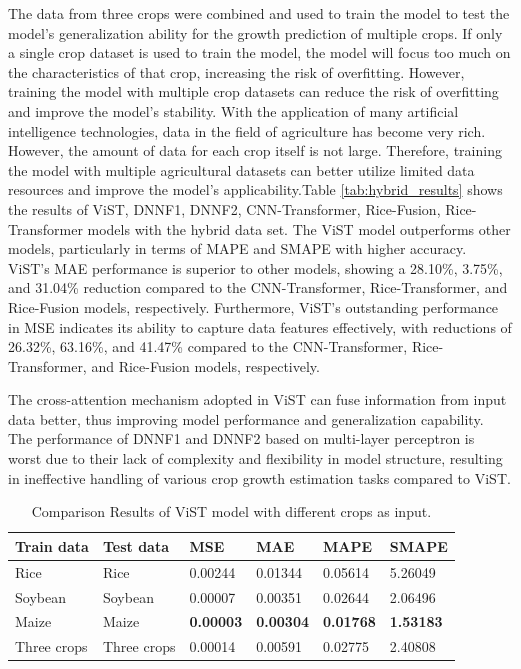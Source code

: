 \documentclass[acmsmall,manuscript, screen, review]{acmart}
\begin{document}
The data from three crops were combined and used to train the model to test the model's generalization ability for the growth prediction of multiple crops. If only a single crop dataset is used to train the model, the model will focus too much on the characteristics of that crop, increasing the risk of overfitting. However, training the model with multiple crop datasets can reduce the risk of overfitting and improve the model's stability. With the application of many artificial intelligence technologies, data in the field of agriculture has become very rich. However, the amount of data for each crop itself is not large. Therefore, training the model with multiple agricultural datasets can better utilize limited data resources and improve the model's applicability.Table \ref{tab:hybrid_results} shows the results of ViST, DNNF1, DNNF2, CNN-Transformer, Rice-Fusion, Rice-Transformer models with the hybrid data set. The ViST model outperforms other models, particularly in terms of MAPE and SMAPE with higher accuracy. ViST's MAE performance is superior to other models, showing a 28.10\%, 3.75\%, and 31.04\% reduction compared to the CNN-Transformer, Rice-Transformer, and Rice-Fusion models, respectively. Furthermore, ViST's outstanding performance in MSE indicates its ability to capture data features effectively, with reductions of 26.32\%, 63.16\%, and 41.47\% compared to the CNN-Transformer, Rice-Transformer, and Rice-Fusion models, respectively.

The cross-attention mechanism adopted in ViST can fuse information from input data better, thus improving model performance and generalization capability. The performance of DNNF1 and DNNF2 based on multi-layer perceptron is worst due to their lack of complexity and flexibility in model structure, resulting in ineffective handling of various crop growth estimation tasks compared to ViST.

\begin{table}[htbp]
  \centering
  \caption{Comparison Results of ViST model with different crops as input.}
    \begin{tabular}{llllll}
    \toprule
    Train data & \multicolumn{1}{l}{Test data} & \multicolumn{1}{l}{MSE} & \multicolumn{1}{l}{MAE} & \multicolumn{1}{l}{MAPE} & \multicolumn{1}{l}{SMAPE} \\
    \midrule
    Rice  & Rice  & 0.00244 & 0.01344 & 0.05614 & 5.26049 \\
    Soybean & Soybean & 0.00007 & 0.00351 & 0.02644 & 2.06496 \\
    Maize & Maize & \textbf{0.00003} & \textbf{0.00304} & \textbf{0.01768} & \textbf{1.53183} \\
    Three crops & Three crops & 0.00014 & 0.00591 & 0.02775 & 2.40808 \\
    \bottomrule
    \end{tabular}%
  \label{tab:ubiquitous}%
\end{table}%
\end{document}
